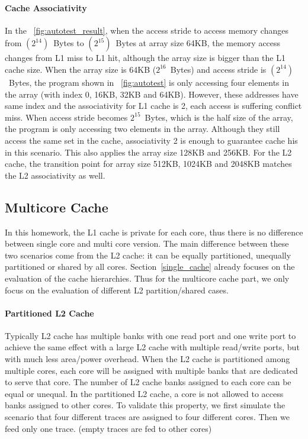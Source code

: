 \documentclass[12pt]{report}
\newcommand{\Fig}[1]{\figurename~\ref{#1}}
\newcommand{\Sec}[1]{Section~\ref{#1}}
\begin{document}
\paragraph{Cache Associativity}
In the \Fig{fig:autotest_result}, when the access stride to access memory changes from $(2^{14})$~Bytes to $(2^{15})$~Bytes at array size 64KB, the memory access changes from L1 miss to L1 hit, although the array size is bigger than the L1 cache size. When the array size is 64KB ($2^{16}$~Bytes) and access stride is $(2^{14})$~Bytes, the program shown in \Fig{fig:autotest} is only accessing four elements in the array (with index 0, 16KB, 32KB and 64KB). However, these addresses have same index and the associativity for L1 cache is 2, each access is suffering conflict miss. When access stride becomes $2^{15}$~Bytes, which is the half size of the array, the program is only accessing two elements in the array. Although they still access the same set in the cache, associativity 2 is enough to guarantee cache his in this scenario. This also applies the array size 128KB and 256KB. For the L2 cache, the transition point for array size 512KB, 1024KB and 2048KB matches the L2 associativity as well.

\subsection{Multicore Cache}

In this homework, the L1 cache is private for each core, thus there is no difference between single core and multi core version. The main difference between these two scenarios come from the L2 cache: it can be equally partitioned, unequally partitioned or shared by all cores. \Sec{single_cache} already focuses on the evaluation of the cache hierarchies. Thus for the multicore cache part, we only focus on the evaluation of different L2 partition/shared cases.

\paragraph{Partitioned L2 Cache}
Typically L2 cache has multiple banks with one read port and one write port to achieve the same effect with a large L2 cache with multiple read/write ports, but with much less area/power overhead. When the L2 cache is partitioned among multiple cores, each core will be assigned with multiple banks that are dedicated to serve that core. The number of L2 cache banks assigned to each core can be equal or unequal. In the partitioned L2 cache, a core is not allowed to access banks assigned to other cores. To validate this property, we first simulate the scenario that four different traces are assigned to four different cores. Then we feed only one trace. (empty traces are fed to other cores)
\end{document}
